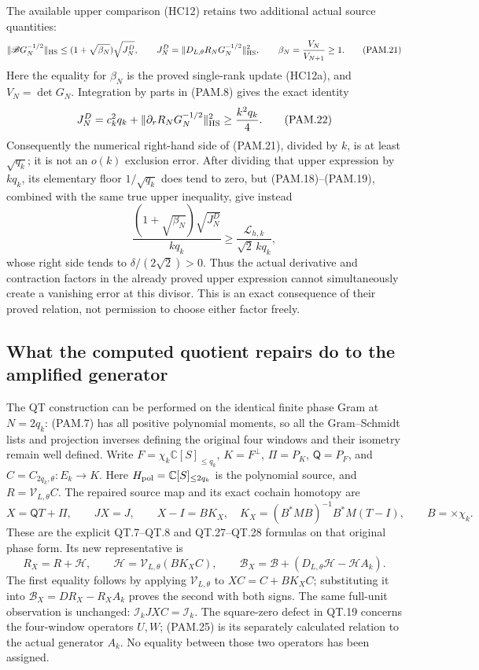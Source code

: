 The available upper comparison (HC12) retains two additional actual
source quantities:
\[
 \|\mathscr B G_N^{-1/2}\|_{\rm HS}
 \le(1+\sqrt{\beta_N})\sqrt{J_N^D},\qquad
 J_N^D=\|D_{L,\theta}R_NG_N^{-1/2}\|_{\rm HS}^2,\qquad
 \beta_N=\frac{V_N}{V_{N+1}}\ge1 .
 \tag{PAM.21}\label{eq:pam-upper}
\]
Here the equality for \(\beta_N\) is the proved single-rank update
(HC12a), and \(V_N=\det G_N\). Integration by parts in (PAM.8)
gives the exact identity
\[
 J_N^D=c_k^2q_k+
       \|\partial_rR_NG_N^{-1/2}\|_{\rm HS}^2
       \ge\frac{k^2q_k}{4}.
 \tag{PAM.22}\label{eq:pam-derivative}
\]
Consequently the numerical right-hand side of (PAM.21), divided
by \(k\), is at least \(\sqrt{q_k}\); it is not an
\(o(k)\) exclusion error. After dividing that upper expression by
\(kq_k\), its elementary floor \(1/\sqrt{q_k}\) does tend to zero,
but (PAM.18)--(PAM.19), combined with the same true upper inequality,
give instead
\[
 \frac{(1+\sqrt{\beta_N})\sqrt{J_N^D}}{kq_k}
 \ge\frac{\mathcal L_{h,k}}{\sqrt2\,kq_k},
 \tag{PAM.23}\label{eq:pam-combinedupper}
\]
whose right side tends to \(\delta/(2\sqrt2)>0\).
Thus the actual derivative and contraction factors in the already
proved upper expression cannot simultaneously create a vanishing
error at this divisor. This is an exact consequence of their
proved relation, not permission to choose either factor freely.

\subsection{What the computed quotient repairs do to the amplified generator}

The QT construction can be performed on the identical finite phase
Gram at \(N=2q_k\): (PAM.7) has all positive polynomial moments,
so all the Gram--Schmidt lists and projection inverses defining
the original four windows and their isometry remain well defined.
Write \(F=\chi_k\mathbb C[S]_{\le q_k}\),
\(K=F^\perp\), \(\Pi=P_K\), \(\mathsf Q=P_F\), and
\(C=C_{2q_k,\theta}:E_k\to K\).
Here \(H_{\rm pol}=\mathbb C[S]_{\le2q_k}\) is the polynomial
source, and \(R=\mathcal V_{L,\theta}C\).
The repaired source map and its exact cochain homotopy are
\[
 X=\mathsf QT+\Pi,\qquad JX=J,\qquad
 X-I=B K_X,\quad
 K_X=(B^*MB)^{-1}B^*M(T-I),\qquad B=\times\chi_k .
 \tag{PAM.24}\label{eq:pam-repair}
\]
These are the explicit QT.7--QT.8 and QT.27--QT.28 formulas
on that original phase form. Its new representative is
\[
 R_X=R+\mathcal H,\qquad
 \mathcal H=\mathcal V_{L,\theta}(B K_XC),\qquad
 \mathscr B_X
 =\mathscr B+(D_{L,\theta}\mathcal H-\mathcal H A_k).
 \tag{PAM.25}\label{eq:pam-repairboundary}
\]
The first equality follows by applying \(\mathcal V_{L,\theta}\)
to \(XC=C+BK_XC\); substituting it into
\(\mathscr B_X=DR_X-R_XA_k\) proves the second with both signs.
The same full-unit observation is unchanged:
\(\mathcal I_kJXC=\mathcal I_k\).
The square-zero defect in QT.19 concerns the four-window operators
\(U,W\); (PAM.25) is its separately calculated relation to the
actual generator \(A_k\). No equality between those two operators
has been assigned.

